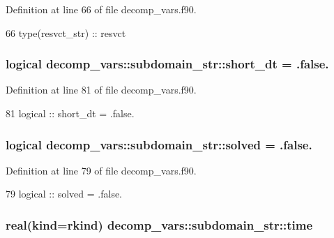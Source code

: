 Definition at line 66 of file decomp\+\_\+vars.\+f90.


\begin{DoxyCode}
66     \textcolor{keywordtype}{type}(resvct_str) :: resvct
\end{DoxyCode}
\subsubsection[{short\+\_\+dt}]{\setlength{\rightskip}{0pt plus 5cm}logical decomp\+\_\+vars\+::subdomain\+\_\+str\+::short\+\_\+dt = .false.}\label{structdecomp__vars_1_1subdomain__str_a33f86009e7cd61eec1f0ae220e824fec}


Definition at line 81 of file decomp\+\_\+vars.\+f90.


\begin{DoxyCode}
81     \textcolor{keywordtype}{logical} :: short\_dt = .false.
\end{DoxyCode}
\subsubsection[{solved}]{\setlength{\rightskip}{0pt plus 5cm}logical decomp\+\_\+vars\+::subdomain\+\_\+str\+::solved = .false.}\label{structdecomp__vars_1_1subdomain__str_a1f78ad5732eb8fe2b98a3551cb3ad2a6}


Definition at line 79 of file decomp\+\_\+vars.\+f90.


\begin{DoxyCode}
79     \textcolor{keywordtype}{logical} :: solved = .false.
\end{DoxyCode}
\subsubsection[{time}]{\setlength{\rightskip}{0pt plus 5cm}real(kind=rkind) decomp\+\_\+vars\+::subdomain\+\_\+str\+::time}\label{structdecomp__vars_1_1subdomain__str_a9497d79deeea57a65b9ebb0760cee631}


